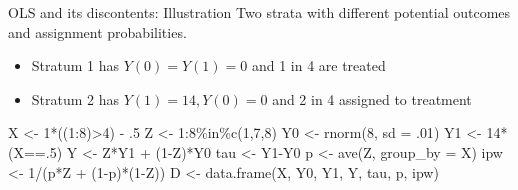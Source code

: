 \documentclass[
  11pt,
  ignorenonframetext,
]{beamer}
\newenvironment{Shaded}{\begin{snugshade}}{\end{snugshade}}
\newcommand{\AttributeTok}[1]{\textcolor[rgb]{0.40,0.45,0.13}{#1}}
\newcommand{\DecValTok}[1]{\textcolor[rgb]{0.68,0.00,0.00}{#1}}
\newcommand{\FunctionTok}[1]{\textcolor[rgb]{0.28,0.35,0.67}{#1}}
\newcommand{\NormalTok}[1]{\textcolor[rgb]{0.00,0.23,0.31}{#1}}
\newcommand{\OtherTok}[1]{\textcolor[rgb]{0.00,0.23,0.31}{#1}}
\newcommand{\SpecialCharTok}[1]{\textcolor[rgb]{0.37,0.37,0.37}{#1}}
\providecommand{\tightlist}{%
  \setlength{\itemsep}{0pt}\setlength{\parskip}{0pt}}\usepackage{longtable,booktabs,array}
\begin{document}
\begin{frame}[fragile]{OLS and its discontents: Illustration}
\protect\hypertarget{ols-and-its-discontents-illustration}{}
Two strata with different potential outcomes and assignment
probabilities.

\begin{itemize}
\tightlist
\item
  Stratum 1 has \(Y(0)=Y(1)=0\) and 1 in 4 are treated
\item
  Stratum 2 has \(Y(1)=14, Y(0)=0\) and 2 in 4 assigned to treatment
\end{itemize}

\begin{Shaded}
\begin{Highlighting}[]
\NormalTok{X   }\OtherTok{\textless{}{-}} \DecValTok{1}\SpecialCharTok{*}\NormalTok{((}\DecValTok{1}\SpecialCharTok{:}\DecValTok{8}\NormalTok{)}\SpecialCharTok{\textgreater{}}\DecValTok{4}\NormalTok{) }\SpecialCharTok{{-}}\NormalTok{ .}\DecValTok{5}
\NormalTok{Z   }\OtherTok{\textless{}{-}} \DecValTok{1}\SpecialCharTok{:}\DecValTok{8}\SpecialCharTok{\%in\%}\FunctionTok{c}\NormalTok{(}\DecValTok{1}\NormalTok{,}\DecValTok{7}\NormalTok{,}\DecValTok{8}\NormalTok{)}
\NormalTok{Y0  }\OtherTok{\textless{}{-}} \FunctionTok{rnorm}\NormalTok{(}\DecValTok{8}\NormalTok{, }\AttributeTok{sd =}\NormalTok{ .}\DecValTok{01}\NormalTok{)}
\NormalTok{Y1  }\OtherTok{\textless{}{-}} \DecValTok{14}\SpecialCharTok{*}\NormalTok{(X}\SpecialCharTok{==}\NormalTok{.}\DecValTok{5}\NormalTok{)}
\NormalTok{Y   }\OtherTok{\textless{}{-}}\NormalTok{ Z}\SpecialCharTok{*}\NormalTok{Y1 }\SpecialCharTok{+}\NormalTok{ (}\DecValTok{1}\SpecialCharTok{{-}}\NormalTok{Z)}\SpecialCharTok{*}\NormalTok{Y0}
\NormalTok{tau }\OtherTok{\textless{}{-}}\NormalTok{ Y1}\SpecialCharTok{{-}}\NormalTok{Y0}
\NormalTok{p   }\OtherTok{\textless{}{-}} \FunctionTok{ave}\NormalTok{(Z, }\AttributeTok{group\_by =}\NormalTok{ X)}
\NormalTok{ipw }\OtherTok{\textless{}{-}} \DecValTok{1}\SpecialCharTok{/}\NormalTok{(p}\SpecialCharTok{*}\NormalTok{Z }\SpecialCharTok{+}\NormalTok{ (}\DecValTok{1}\SpecialCharTok{{-}}\NormalTok{p)}\SpecialCharTok{*}\NormalTok{(}\DecValTok{1}\SpecialCharTok{{-}}\NormalTok{Z))}
\NormalTok{D   }\OtherTok{\textless{}{-}} \FunctionTok{data.frame}\NormalTok{(X, Y0, Y1, Y, tau, p, ipw)}
\end{Highlighting}
\end{Shaded}
\end{frame}
\end{document}
